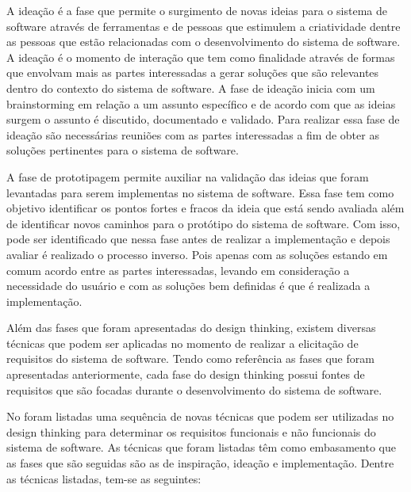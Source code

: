 \documentclass[a4paper,twoside]{article}
\begin{document}
A ideação é a fase que permite o surgimento de novas ideias para o sistema de software através de ferramentas e de pessoas que estimulem a criatividade dentre as pessoas que estão relacionadas com o desenvolvimento do sistema de software. A ideação é o momento de interação que tem como finalidade através de formas que envolvam mais as partes interessadas a gerar soluções que são relevantes dentro do contexto do sistema de software. A fase de ideação inicia com um brainstorming em relação a um assunto específico e de acordo com que as ideias surgem o assunto é discutido, documentado e validado. Para realizar essa fase de ideação são necessárias reuniões com as partes interessadas a fim de obter as soluções pertinentes para o sistema de software\cite{DBLP:journals/information/MartinsJCKPO19}.

A fase de prototipagem permite auxiliar na validação das ideias que foram levantadas para serem implementas no sistema de software. Essa fase tem como objetivo identificar os pontos fortes e fracos da ideia que está sendo avaliada além de identificar novos caminhos para o protótipo do sistema de software. Com isso, pode ser identificado que nessa fase antes de realizar a implementação e depois avaliar é realizado o processo inverso. Pois apenas com as soluções estando em comum acordo entre as partes interessadas, levando em consideração a necessidade do usuário e com as soluções bem definidas é que é realizada a implementação. 

Além das fases que foram apresentadas do design thinking, existem diversas técnicas que podem ser aplicadas no momento de realizar a elicitação de requisitos do sistema de software.
Tendo como referência as fases que foram apresentadas anteriormente, cada fase do design thinking possui fontes de requisitos que são focadas durante o desenvolvimento do sistema de software\cite{DBLP:journals/iet-sen/SouzaFVCMC20}.

No \cite{DBLP:journals/iet-sen/SouzaFVCMC20} foram listadas uma sequência de novas técnicas que podem ser utilizadas no design thinking para determinar os requisitos funcionais e não funcionais do sistema de software. As técnicas que foram listadas têm como embasamento que  as fases que são seguidas são as de inspiração, ideação e implementação. Dentre as técnicas listadas, tem-se as seguintes:
\end{document}
